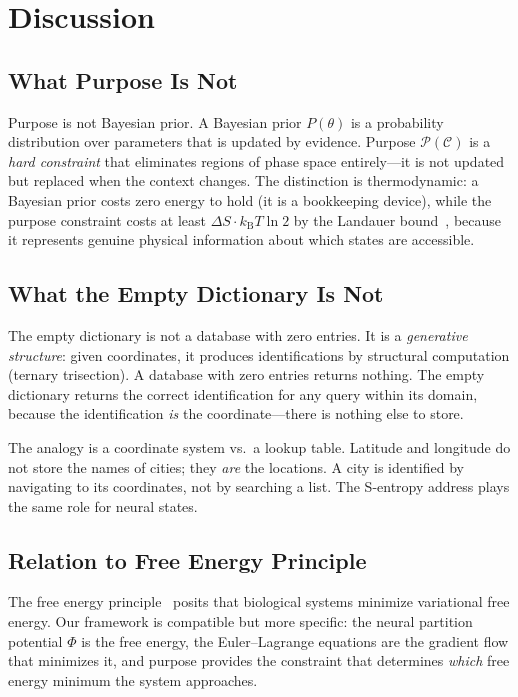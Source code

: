 \documentclass[aps,prd,twocolumn,superscriptaddress,floatfix,nofootinbib]{revtex4-2}
\theoremstyle{remark}
\newcommand{\kB}{k_{\mathrm{B}}}
\newcommand{\Pot}{\Phi}
\newcommand{\Purpose}{\mathcal{P}}
\newcommand{\Context}{\mathcal{C}}
\begin{document}
\section{Discussion}
\label{sec:discussion}

\subsection{What Purpose Is Not}

Purpose is not Bayesian prior.
A Bayesian prior $P(\theta)$ is a probability distribution over parameters that is updated by evidence.
Purpose $\Purpose(\Context)$ is a \emph{hard constraint} that eliminates regions of phase space entirely---it is not updated but replaced when the context changes.
The distinction is thermodynamic: a Bayesian prior costs zero energy to hold (it is a bookkeeping device), while the purpose constraint costs at least $\Delta S \cdot \kB T \ln 2$ by the Landauer bound~\cite{landauer1961}, because it represents genuine physical information about which states are accessible.

\subsection{What the Empty Dictionary Is Not}

The empty dictionary is not a database with zero entries.
It is a \emph{generative structure}: given coordinates, it produces identifications by structural computation (ternary trisection).
A database with zero entries returns nothing.
The empty dictionary returns the correct identification for any query within its domain, because the identification \emph{is} the coordinate---there is nothing else to store.

The analogy is a coordinate system vs.\ a lookup table.
Latitude and longitude do not store the names of cities; they \emph{are} the locations.
A city is identified by navigating to its coordinates, not by searching a list.
The S-entropy address plays the same role for neural states.

\subsection{Relation to Free Energy Principle}

The free energy principle~\cite{friston2006,friston2010} posits that biological systems minimize variational free energy.
Our framework is compatible but more specific: the neural partition potential $\Pot$ is the free energy, the Euler--Lagrange equations are the gradient flow that minimizes it, and purpose provides the constraint that determines \emph{which} free energy minimum the system approaches.
\end{document}
